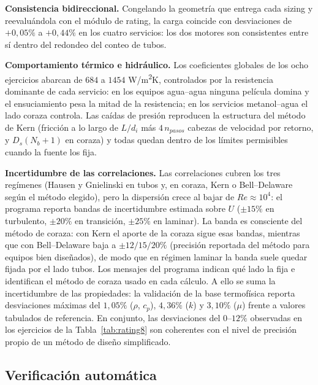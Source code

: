 \documentclass[11pt,a4paper]{article}
\begin{document}
\textbf{Consistencia bidireccional.} Congelando la geometr\'ia que entrega
cada sizing y reevalu\'andola con el m\'odulo de rating, la carga coincide
con desviaciones de $+0{,}05\%$ a $+0{,}44\%$ en los cuatro servicios:
los dos motores son consistentes entre s\'i dentro del redondeo del conteo
de tubos.

\textbf{Comportamiento t\'ermico e hidr\'aulico.} Los coeficientes
globales de los ocho ejercicios abarcan de $684$ a $1454$
W/m\textsuperscript{2}K, controlados por la resistencia dominante de cada
servicio: en los equipos agua--agua ninguna pel\'icula domina y el
ensuciamiento pesa la mitad de la resistencia; en los servicios metanol--agua
el lado coraza controla. Las ca\'idas de presi\'on reproducen la estructura
del m\'etodo de Kern (fricci\'on a lo largo de $L/d_i$ m\'as
$4\,n_{pasos}$ cabezas de velocidad por retorno, y
$D_s(N_b+1)$ en coraza) y todas quedan dentro de los l\'imites permisibles
cuando la fuente los fija.

\textbf{Incertidumbre de las correlaciones.} Las correlaciones cubren los
tres reg\'imenes (Hausen y Gnielinski en tubos y, en coraza, Kern 
o Bell--Delaware seg\'un el m\'etodo elegido), pero la
dispersi\'on crece al bajar de $Re \approx 10^4$: el programa reporta
bandas de incertidumbre estimada sobre $U$ ($\pm 15\%$ en turbulento, $\pm 20\%$ en transici\'on, $\pm 25\%$ en laminar). La banda es consciente del m\'etodo de coraza: con Kern el aporte de la coraza sigue esas bandas, mientras que con Bell--Delaware baja a $\pm 12/15/20\%$ (precisi\'on reportada del m\'etodo para equipos bien dise\~nados), de modo que en r\'egimen laminar la banda suele quedar fijada por el lado tubos. Los mensajes del programa indican qu\'e lado la fija e identifican 
el m\'etodo de coraza usado en cada c\'alculo. A ello se suma la incertidumbre de las propiedades: la
validaci\'on de la base termof\'isica \cite{informe} reporta
desviaciones m\'aximas del $1{,}05\%$ ($\rho$, $c_p$), $4{,}36\%$
($k$) y $3{,}10\%$ ($\mu$) frente a valores tabulados de referencia. En
conjunto, las desviaciones del $0$--$12\%$ observadas en los ejercicios de
la Tabla~\ref{tab:rating8} son coherentes con el nivel de precisi\'on
propio de un m\'etodo de dise\~no simplificado.

\subsection{Verificaci\'on autom\'atica}
\end{document}
